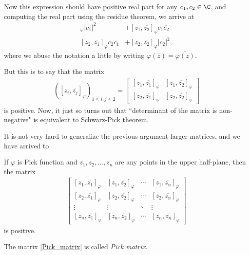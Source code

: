 Now this expression should have positive real part for any $c_{1}, c_{2} \in \C$, and computing the real part using the residue theorem, we arrive at
\begin{align*}
	[z_{1}, \overline{z_{1}}]_{\varphi} |c_{1}|^{2} &+ [z_{1}, \overline{z_{2}}]_{\varphi} c_{1} \overline{c_{2}} \\
	[z_{2}, \overline{z_{1}}]_{\varphi} c_{2} \overline{c_{1}} &+ [z_{2}, \overline{z_{2}}]_{\varphi} |c_{2}|^{2},
\end{align*}
where we abuse the notation a little by writing $\varphi(\overline{z}) = \overline{\varphi(z)}$.

But this is to say that the matrix
\begin{align*}
	\left([z_{i}, \overline{z_{j}}]_{\varphi}\right)_{1 \leq i, j \leq 2} =
	\begin{bmatrix}
		[z_{1}, \overline{z_{1}}]_{\varphi} & [z_{1}, \overline{z_{2}}]_{\varphi} \\
		[z_{2}, \overline{z_{1}}]_{\varphi} & [z_{2}, \overline{z_{2}}]_{\varphi}
	\end{bmatrix}
\end{align*}
is positive. Now, it just so turns out that ``determinant of the matrix is non-negative" is equivalent to Schwarz-Pick theorem.

It is not very hard to generalize the previous argument larger matrices, and we have arrived to
\begin{lause}\label{pick-nevanlinna_theorem}
	If $\varphi$ is Pick function and $z_{1}, z_{2}, \ldots, z_{n}$ are any points in the upper half-plane, then the matrix
	\begin{align}\label{Pick_matrix}
	\begin{bmatrix}
		[z_{1}, \overline{z_{1}}]_{\varphi} & [z_{1}, \overline{z_{2}}]_{\varphi} & \cdots & [z_{1}, \overline{z_{n}}]_{\varphi} \\
		[z_{2}, \overline{z_{1}}]_{\varphi} & [z_{2}, \overline{z_{2}}]_{\varphi} & \cdots & [z_{2}, \overline{z_{n}}]_{\varphi} \\
		\vdots & \vdots & \ddots & \vdots \\
		[z_{n}, \overline{z_{1}}]_{\varphi} & [z_{n}, \overline{z_{2}}]_{\varphi} & \cdots &  [z_{n}, \overline{z_{n}}]_{\varphi}
	\end{bmatrix}
	\end{align}
	is positive.
\end{lause}

The matrix \ref{Pick_matrix} is called \textit{Pick matrix}.

